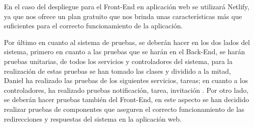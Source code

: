 En el caso del despliegue para el Front-End en aplicación web se utilizará Netlify, ya que nos ofrece un plan gratuito que nos brinda unas características más que suficientes para el correcto funcionamiento de la aplicación.

Por último en cuanto al sistema de pruebas, se deberán hacer en los dos lados del sistema, primero en cuanto a las pruebas que se harán en el Back-End, se harán pruebas unitarias, de todos los servicios y controladores del sistema, para la realización de estas pruebas se han tomado las clases y dividido a la mitad, Daniel ha realizado las pruebas de los siguientes servicios, tareas; en cuanto a los controladores, ha realizado pruebas notificación, tarea, invitación . Por otro lado, se deberán hacer pruebas también del Front-End, en este aspecto se han decidido realizar pruebas de componentes que aseguren el correcto funcionamiento de las redirecciones y respuestas del sistema en la aplicación web.
